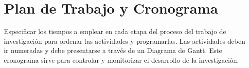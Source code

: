 \chapter{Plan de Trabajo y Cronograma}

Especificar los tiempos a emplear en cada etapa del proceso del trabajo de investigación para ordenar las actividades y programarlas. Las actividades deben ir numeradas y debe presentarse a través de un Diagrama de Gantt. Este cronograma sirve para controlar y monitorizar el desarrollo de la investigación. \cite{einstein}